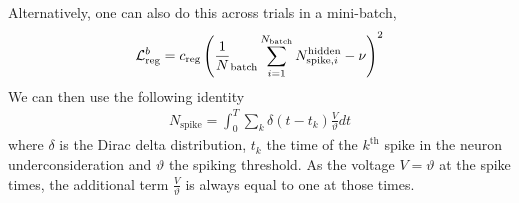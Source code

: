 \documentclass[a4paper]{article}
\begin{document}
  Alternatively, one can also do this across trials in a mini-batch,
  \begin{align}
    {\cal L}^b_{\text{reg}} = c_{\text{reg}} \left(\frac{1}{N}_{\text{batch}} \sum_{i=1}^{N_{\text{batch}}} N_{\text{spike}, i}^{\text{hidden}} - \nu\right)^2
  \end{align}
  We can then use the following identity
  \begin{align}
    N_{\text{spike}} = \int_0^T \sum_k \delta(t-t_{k})
    \frac{V}{\vartheta} dt
  \end{align}
  where $\delta$ is the Dirac delta distribution, $t_k$ the time of
  the $k^{\text{th}}$ spike in the neuron underconsideration and $\vartheta$ the
  spiking threshold. As the voltage $V= \vartheta$ at the spike times,
  the additional term $\frac{V}{\vartheta}$ is always equal to one at
  those times.
  
\end{document}
